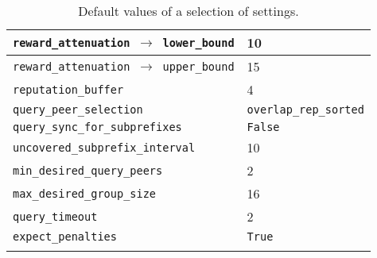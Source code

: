 \begin{longtable}{|l|l|}
\hline
\cellcolor{slightgray}\T \texttt{reward\_attenuation $\rightarrow$ lower\_bound} & 10 \B\\
\hline
\cellcolor{slightgray}\T \texttt{reward\_attenuation $\rightarrow$ upper\_bound} & 15 \B\\
\hline
\cellcolor{slightgray}\T \texttt{reputation\_buffer} & 4 \B\\
\hline
\cellcolor{slightgray}\T \texttt{query\_peer\_selection} & \texttt{overlap\_rep\_sorted} \B\\
\hline
\cellcolor{slightgray}\T \texttt{query\_sync\_for\_subprefixes} & \texttt{False} \B\\
\hline
\cellcolor{slightgray}\T \texttt{uncovered\_subprefix\_interval} & 10 \B\\
\hline
\cellcolor{slightgray}\T \texttt{min\_desired\_query\_peers} & 2 \B\\
\hline
\cellcolor{slightgray}\T \texttt{max\_desired\_group\_size} & 16 \B\\
\hline
\cellcolor{slightgray}\T \texttt{query\_timeout} & 2 \B\\
\hline
\cellcolor{slightgray}\T \texttt{expect\_penalties} & \texttt{True} \B\\
\hline
\caption{Default values of a selection of settings.}
\label{tab:default_settings}
\end{longtable}

